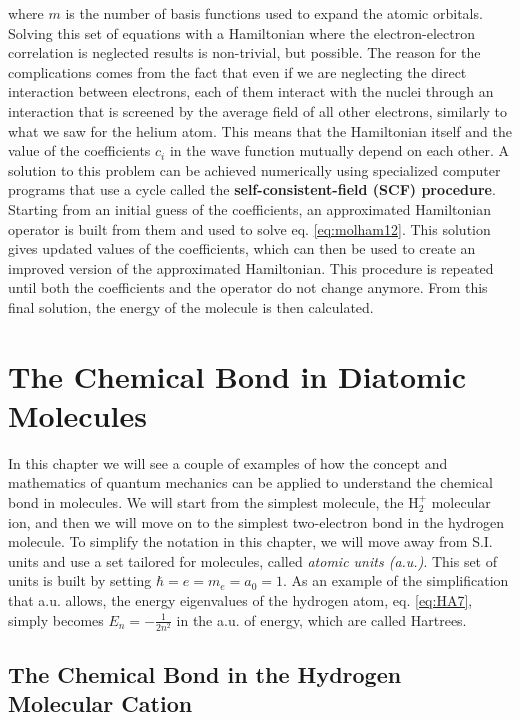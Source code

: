 \documentclass[
  9pt,
]{extbook}
\theoremstyle{definition}
\theoremstyle{definition}
\theoremstyle{definition}
\theoremstyle{remark}
\begin{document}
where \(m\) is the number of basis functions used to expand the atomic orbitals. Solving this set of equations with a Hamiltonian where the electron-electron correlation is neglected results is non-trivial, but possible. The reason for the complications comes from the fact that even if we are neglecting the direct interaction between electrons, each of them interact with the nuclei through an interaction that is screened by the average field of all other electrons, similarly to what we saw for the helium atom. This means that the Hamiltonian itself and the value of the coefficients \(c_i\) in the wave function mutually depend on each other. A solution to this problem can be achieved numerically using specialized computer programs that use a cycle called the \textbf{self-consistent-field (SCF) procedure}. Starting from an initial guess of the coefficients, an approximated Hamiltonian operator is built from them and used to solve eq. \eqref{eq:molham12}. This solution gives updated values of the coefficients, which can then be used to create an improved version of the approximated Hamiltonian. This procedure is repeated until both the coefficients and the operator do not change anymore. From this final solution, the energy of the molecule is then calculated.

\hypertarget{Bonds}{%
\chapter{The Chemical Bond in Diatomic Molecules}\label{Bonds}}

In this chapter we will see a couple of examples of how the concept and mathematics of quantum mechanics can be applied to understand the chemical bond in molecules. We will start from the simplest molecule, the \(\mathrm{H}_2^+\) molecular ion, and then we will move on to the simplest two-electron bond in the hydrogen molecule. To simplify the notation in this chapter, we will move away from S.I. units and use a set tailored for molecules, called \emph{atomic units (a.u.)}. This set of units is built by setting \(\hbar=e=m_e=a_0=1\). As an example of the simplification that a.u. allows, the energy eigenvalues of the hydrogen atom, eq. \eqref{eq:HA7}, simply becomes \(E_n=-\frac{1}{2n^2}\) in the a.u. of energy, which are called Hartrees.

\hypertarget{the-chemical-bond-in-the-hydrogen-molecular-cation}{%
\section{The Chemical Bond in the Hydrogen Molecular Cation}\label{the-chemical-bond-in-the-hydrogen-molecular-cation}}
\end{document}
